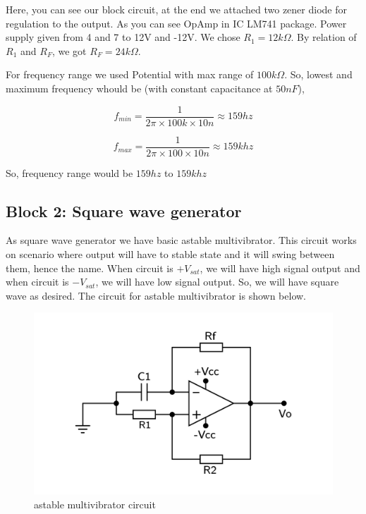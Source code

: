 \documentclass{article}
\begin{document}
Here, you can see our block circuit, at the end we attached two zener diode for regulation to the output. As you can see OpAmp in IC LM741 package. Power supply given from  4 and 7 to 12V and -12V. We chose \(R_{1}=12k\Omega\). By relation of \(R_{1}\) and \(R_{F}\), we got \(R_{F}=24k\Omega\).

For frequency range we used Potential with max range of \(100k\Omega\). So, lowest and maximum frequency whould be (with constant capacitance at \(50nF\)),

\begin{equation*}
\label{eq:org42211f7}
  f_{min} = \frac{1}{2\pi\times100k\times 10n} \approx 159 hz
\end{equation*}

\begin{equation*}
\label{eq:orgc1296c7}
  f_{max} = \frac{1}{2\pi\times100\times 10n} \approx 159k hz
\end{equation*}

So, frequency range would be \(159 hz\) to \(159k hz\)


\subsection{Block 2: Square wave generator}
\label{sec:org0b9a3e3}

As square wave generator we have basic astable multivibrator. This circuit works on scenario where output will have to stable state and it will swing between them, hence the name. When circuit is \(+V_{sat}\), we will have high signal output and when circuit is \(-V_{sat}\), we will have low signal output. So, we will have square wave as desired. The circuit for astable multivibrator is shown below.

\begin{figure}[htbp]
\centering
\includegraphics[width=0.7 \textwidth]{imgs/square.png}
\caption{\label{fig:org26c3f2e}astable multivibrator circuit}
\end{figure}
\end{document}
